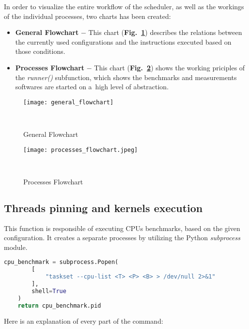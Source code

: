 In order to visualize the entire workflow of the scheduler, as well as the 
workings of the individual processes, two charts has been created:
\begin{itemize}
    \item \textbf{General Flowchart} $-$ This chart
    (\textbf{Fig.~\ref{fig:general_flowchart}}) describes the relations
    between the currently used configurations and the instructions executed
    based on those conditions.
    \item \textbf{Processes Flowchart} $-$ This chart
    (\textbf{Fig.~\ref{fig:processes_flowchart}}) shows the working priciples of the
    \emph{runner\@()} subfunction, which shows the benchmarks and measurements
    softwares are started on a~high level of abstraction.
\end{itemize}

\newpage

\begin{figure}[hbtp!]
    \centering
    \texttt{[image: general\_flowchart]}
    \caption{General Flowchart}~\label{fig:general_flowchart}
\end{figure}

\begin{figure}[hbtp!]
    \centering
    \texttt{[image: processes\_flowchart.jpeg]}
    \caption{Processes Flowchart}~\label{fig:processes_flowchart}
\end{figure}

\newpage

\subsection{Threads pinning and kernels execution}

This function is responsible of executing CPUs benchmarks, based on the
given configuration. It creates a separate processes by utilizing the
Python \emph{subprocess} module. 

\begin{lstlisting}[language=Python]
    cpu_benchmark = subprocess.Popen(
        [
            "taskset --cpu-list <T> <P> <B> > /dev/null 2>&1"
        ],
        shell=True
    )
    return cpu_benchmark.pid
\end{lstlisting}

Here is an explanation of every part of the command:

